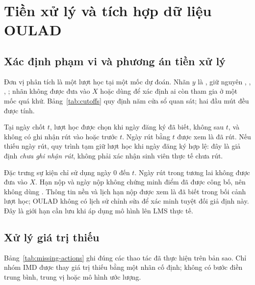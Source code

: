 \chapter{Tiền xử lý và tích hợp dữ liệu OULAD}
\label{chap:preprocess}

\section{Xác định phạm vi và phương án tiền xử lý}
Đơn vị phân tích là một lượt học tại một mốc dự đoán. Nhãn \(y\) là , giữ nguyên , , , ; nhãn không được đưa vào \(X\) hoặc dùng để xác định ai còn tham gia ở một mốc quá khứ. Bảng~\ref{tab:cutoffs} quy định năm cửa sổ quan sát; hai đầu mút đều được tính.

\begin{table}[tbp]
\centering
\caption{Các mốc dự đoán và cửa sổ quan sát dùng chung.}
\label{tab:cutoffs}

\end{table}

Tại ngày chốt \(t\), lượt học được chọn khi ngày đăng ký đã biết, không sau \(t\), và không có ghi nhận rút vào hoặc trước \(t\). Ngày rút bằng \(t\) được xem là đã rút. Nếu thiếu ngày rút, quy trình tạm giữ lượt học khi ngày đăng ký hợp lệ: đây là giả định \emph{chưa ghi nhận rút}, không phải xác nhận sinh viên thực tế chưa rút.

Đặc trưng sự kiện chỉ sử dụng ngày 0 đến \(t\). Ngày rút trong tương lai không được đưa vào \(X\). Hạn nộp và ngày nộp không chứng minh điểm đã được công bố, nên không dùng . Thông tin nền và lịch hạn nộp được xem là đã biết trong bối cảnh lượt học; OULAD không có lịch sử chỉnh sửa để xác minh tuyệt đối giả định này. Đây là giới hạn cần lưu khi áp dụng mô hình lên LMS thực tế.

\section{Xử lý giá trị thiếu}
Bảng~\ref{tab:missing-actions} ghi đúng các thao tác đã thực hiện trên bản sao. Chỉ nhóm IMD được thay giá trị thiếu bằng một nhãn cố định; không có bước điền trung bình, trung vị hoặc mô hình ước lượng.

\begin{table}[tbp]
\centering
\caption{Quyết định và kết quả xử lý các thuộc tính có giá trị thiếu.}
\label{tab:missing-actions}

\end{table}

